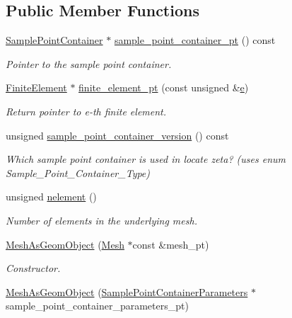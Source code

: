 \subsection*{Public Member Functions}
\begin{DoxyCompactItemize}
\item 
\hyperlink{classSamplePointContainer}{Sample\+Point\+Container} $\ast$ \hyperlink{classoomph_1_1MeshAsGeomObject_adddb31b09b4420410c5f722a6e629791}{sample\+\_\+point\+\_\+container\+\_\+pt} () const
\begin{DoxyCompactList}\small\item\em Pointer to the sample point container. \end{DoxyCompactList}\item 
\hyperlink{classoomph_1_1FiniteElement}{Finite\+Element} $\ast$ \hyperlink{classoomph_1_1MeshAsGeomObject_a4e6be8709931a6b6b600e6640571b2c8}{finite\+\_\+element\+\_\+pt} (const unsigned \&\hyperlink{cfortran_8h_a37cd013acc76697829c324bdd8562d82}{e})
\begin{DoxyCompactList}\small\item\em Return pointer to e-\/th finite element. \end{DoxyCompactList}\item 
unsigned \hyperlink{classoomph_1_1MeshAsGeomObject_a101ce7b988c8fdada2c73bfb1f426141}{sample\+\_\+point\+\_\+container\+\_\+version} () const
\begin{DoxyCompactList}\small\item\em Which sample point container is used in locate zeta? (uses enum Sample\+\_\+\+Point\+\_\+\+Container\+\_\+\+Type) \end{DoxyCompactList}\item 
unsigned \hyperlink{classoomph_1_1MeshAsGeomObject_a331c1f9615df15f8fbde2f0eaa2a19d5}{nelement} ()
\begin{DoxyCompactList}\small\item\em Number of elements in the underlying mesh. \end{DoxyCompactList}\item 
\hyperlink{classoomph_1_1MeshAsGeomObject_a7d232452ef38433a589d030cc8bb4f06}{Mesh\+As\+Geom\+Object} (\hyperlink{classoomph_1_1Mesh}{Mesh} $\ast$const \&mesh\+\_\+pt)
\begin{DoxyCompactList}\small\item\em Constructor. \end{DoxyCompactList}\item 
\hyperlink{classoomph_1_1MeshAsGeomObject_a99a84495095584f4715898f436ad897a}{Mesh\+As\+Geom\+Object} (\hyperlink{classoomph_1_1SamplePointContainerParameters}{Sample\+Point\+Container\+Parameters} $\ast$sample\+\_\+point\+\_\+container\+\_\+parameters\+\_\+pt)

\end{DoxyCompactItemize}

